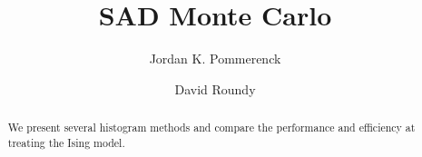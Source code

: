 \documentclass[letterpaper,twocolumn,amsmath,amssymb,pre,aps,10pt]{revtex4-1}
\begin{document}
\title{SAD Monte Carlo}

\author{Jordan K. Pommerenck}
\author{David Roundy}

\begin{abstract}
We present several histogram methods and compare the performance and
efficiency at treating the Ising model.
\end{abstract}

\maketitle


\end{document}
